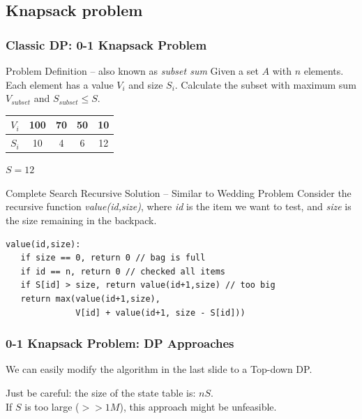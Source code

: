 \documentclass{beamer}
\begin{document}
\subsection{Knapsack problem}
\begin{frame}
  \frametitle{Classic DP: 0-1 Knapsack Problem}
  {\smaller
  \begin{block}{Problem Definition -- also known as \emph{subset sum}}
    Given a set $A$ with $n$ elements. Each element has a value $V_i$
    and size $S_i$. Calculate the subset with maximum sum
    $V_{subset}$ and $S_{subset} \leq S$.
  \end{block}

  \medskip

  \begin{tabular}{|c|c|c|c|c|}
    \hline
    $V_i$ & 100 & 70 & 50 & 10\\
    \hline
    $S_i$ & 10 & 4 & 6 & 12\\
    \hline
  \end{tabular}
  
  \smallskip
  
  $S = 12$

  \begin{block}{Complete Search Recursive Solution -- Similar to Wedding Problem}
    Consider the recursive function \emph{value(id,size)}, where
    \emph{id} is the item we want to test, and \emph{size} is the size
    remaining in the backpack.

    \medskip

\begin{verbatim}
value(id,size):
   if size == 0, return 0 // bag is full
   if id == n, return 0 // checked all items
   if S[id] > size, return value(id+1,size) // too big
   return max(value(id+1,size), 
              V[id] + value(id+1, size - S[id]))
\end{verbatim}
  \end{block}
  }
\end{frame}

\begin{frame}
  \frametitle{0-1 Knapsack Problem: DP Approaches} 

  {\small 
    We can easily modify the algorithm in the last slide to a Top-down
    DP.

    \bigskip

    \alert{Just be careful}: the size of the state table is: $nS$.\\ 
    If $S$ is too large ($>>1M$), this approach might be unfeasible.
  }
\end{frame}
\end{document}
